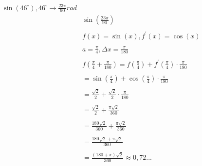 \documentclass{article}
\theoremstyle{mytheoremstyle}
\theoremstyle{mytheoremstyle}
\theoremstyle{myproblemstyle}
\begin{document}
    \begin{equation*} 
        \begin{split}
         \\\sin(46^\circ), 46^\circ \longrightarrow \frac{23\pi }{90}rad\\
             &\sin(\frac{23\pi }{90})\\
             \\
             &f(x)=\sin(x), f^\prime(x)=\cos(x) \\
             \\
             &a=\frac{\pi}{4}, \varDelta x=\frac{\pi}{180}\\
             \\
             &f(\frac{\pi}{4}+\frac{\pi}{180})=f(\frac{\pi}{4})+f^\prime(\frac{\pi}{4})\cdot \frac{\pi}{180}\\
             \\
             &= \sin(\frac{\pi}{4}) + \cos(\frac{\pi}{4})\cdot \frac{\pi}{180} \\
             \\
             &= \frac{\sqrt{2}}{2}+\frac{\sqrt{2}}{2}\cdot \frac{\pi}{180}\\
             \\
             &=\frac{\sqrt{2}}{2}+\frac{\pi\sqrt{2}}{360}\\
             \\
             &=\frac{180\sqrt{2}}{360}+\frac{\pi\sqrt{2}}{360}\\
             \\
             &=\frac{180\sqrt{2}+\pi \sqrt{2}}{360}\\
             \\
             &=\frac{(180+\pi) \sqrt{2}}{360}\approx 0,72...\\
        \end{split}
    \end{equation*}
\end{document}
